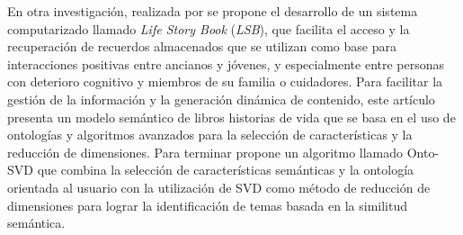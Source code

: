 


En otra investigación, realizada por \cite{shi2012user} se propone el desarrollo de un sistema computarizado llamado \textit{Life Story Book} (\textit{LSB}), que facilita el acceso y la recuperación de recuerdos almacenados que se utilizan como base para interacciones positivas entre ancianos y jóvenes, y especialmente entre personas con deterioro cognitivo y miembros de su familia o cuidadores. Para facilitar la gestión de la información y la generación dinámica de contenido, este artículo presenta un modelo semántico de libros historias de vida que se basa en el uso de ontologías y algoritmos avanzados para la selección de características y la reducción de dimensiones. Para terminar propone un algoritmo llamado Onto-SVD que combina la selección de características semánticas y la ontología orientada al usuario con la utilización de SVD como método de reducción de dimensiones para lograr la identificación de temas basada en la similitud semántica.

